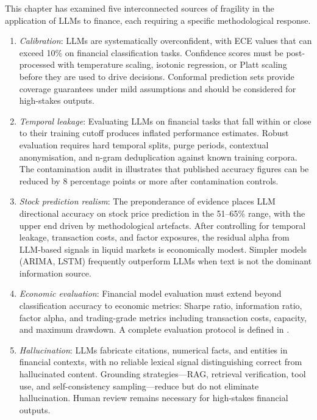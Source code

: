 This chapter has examined five interconnected sources of fragility in the application
of LLMs to finance, each requiring a specific methodological response.

\begin{enumerate}
  \item \emph{Calibration}: LLMs are systematically overconfident, with ECE values
        that can exceed 10\% on financial classification tasks. Confidence scores must
        be post-processed with temperature scaling, isotonic regression, or Platt
        scaling before they are used to drive decisions. Conformal prediction sets
        provide coverage guarantees under mild assumptions and should be considered for
        high-stakes outputs.

  \item \emph{Temporal leakage}: Evaluating LLMs on financial tasks that fall within
        or close to their training cutoff produces inflated performance estimates.
        Robust evaluation requires hard temporal splits, purge periods, contextual
        anonymisation, and n-gram deduplication against known training corpora. The
        contamination audit in  illustrates
        that published accuracy figures can be reduced by 8 percentage points or more
        after contamination controls.

  \item \emph{Stock prediction realism}: The preponderance of evidence places
        LLM directional accuracy on stock price prediction in the 51--65\% range, with
        the upper end driven by methodological artefacts. After controlling for temporal
        leakage, transaction costs, and factor exposures, the residual alpha from
        LLM-based signals in liquid markets is economically modest. Simpler models
        (ARIMA, LSTM) frequently outperform LLMs when text is not the dominant
        information source.

  \item \emph{Economic evaluation}: Financial model evaluation must extend beyond
        classification accuracy to economic metrics: Sharpe ratio, information ratio,
        factor alpha, and trading-grade metrics including transaction costs, capacity,
        and maximum drawdown. A complete evaluation protocol is defined in
        .

  \item \emph{Hallucination}: LLMs fabricate citations, numerical facts, and entities
        in financial contexts, with no reliable lexical signal distinguishing correct from
        hallucinated content. Grounding strategies---RAG, retrieval verification, tool
        use, and self-consistency sampling---reduce but do not eliminate hallucination.
        Human review remains necessary for high-stakes financial outputs.
\end{enumerate}

